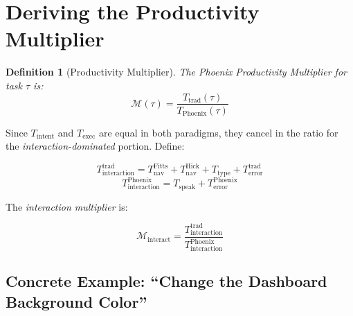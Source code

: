 \documentclass[11pt, a4paper]{article}
\newtheorem{definition}{Definition}
\begin{document}
\section{Deriving the Productivity Multiplier}

\begin{definition}[Productivity Multiplier]
The Phoenix Productivity Multiplier for task $\tau$ is:
\begin{equation}
  \boxed{\mathcal{M}(\tau) = \frac{T_{\text{trad}}(\tau)}{T_{\text{Phoenix}}(\tau)}}
  \label{eq:multiplier}
\end{equation}
\end{definition}

Since $T_{\text{intent}}$ and $T_{\text{exec}}$ are equal in both paradigms, they
cancel in the ratio for the \emph{interaction-dominated} portion. Define:

\begin{equation}
  T_{\text{interaction}}^{\text{trad}} = T_{\text{nav}}^{\text{Fitts}} + T_{\text{nav}}^{\text{Hick}} + T_{\text{type}} + T_{\text{error}}^{\text{trad}}
\end{equation}
\begin{equation}
  T_{\text{interaction}}^{\text{Phoenix}} = T_{\text{speak}} + T_{\text{error}}^{\text{Phoenix}}
\end{equation}

The \emph{interaction multiplier} is:

\begin{equation}
  \mathcal{M}_{\text{interact}} = \frac{T_{\text{interaction}}^{\text{trad}}}{T_{\text{interaction}}^{\text{Phoenix}}}
\end{equation}

\subsection{Concrete Example: ``Change the Dashboard Background Color''}
\end{document}
